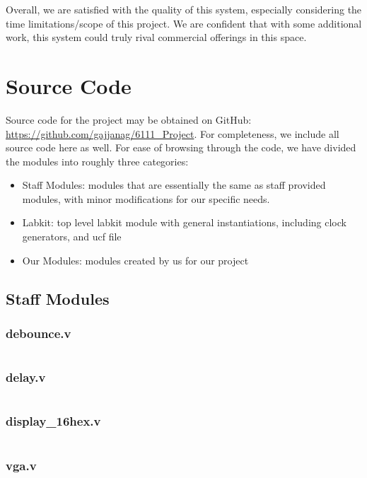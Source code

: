 \documentclass{article}
\begin{document}
Overall, we are satisfied with the quality of this system,
especially considering the time limitations/scope of this project.
We are confident that with some additional work,
this system could truly rival commercial offerings in this space.



\newpage

\appendix

\section{Source Code}
Source code for the project may be obtained on GitHub: \url{https://github.com/gajjanag/6111_Project}.
For completeness, we include all source code here as well.
For ease of browsing through the code, we have divided the modules into roughly three categories:
\begin{itemize}
\item Staff Modules: modules that are essentially the same as staff provided modules, with minor modifications for our specific needs.
\item Labkit: top level labkit module with general instantiations, including clock generators, and ucf file
\item Our Modules: modules created by us for our project
\end{itemize}

\subsection{Staff Modules}
\subsubsection{debounce.v}
\inputminted[linenos]{verilog}{../../src/debounce.v}
\subsubsection{delay.v}
\inputminted[linenos]{verilog}{../../src/delay.v}
\subsubsection{display\_16hex.v}
\inputminted[linenos]{verilog}{../../src/display_16hex.v}
\subsubsection{vga.v}
\inputminted[linenos]{verilog}{../../src/vga.v}
\end{document}
